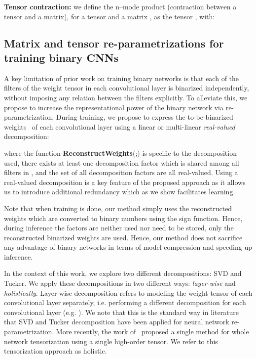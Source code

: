 \documentclass[10pt,twocolumn,letterpaper]{article}
\begin{document}
\noindent \textbf{Tensor contraction:} we define the n--mode product (contraction between a tensor and a matrix), for a tensor  and a matrix , as the tensor , with:















\subsection{Matrix and tensor re-parametrizations for training binary CNNs}\label{ssec:binary-tensorized-convolutional}





A key limitation of prior work on training binary networks is that each of the filters of the weight tensor in each convolutional layer is binarized independently, without imposing any relation between the filters explicitly. To alleviate this, we propose to increase the representational power of the binary network via re-parametrization. During training, we propose to express the to-be-binarized weights~ of each convolutional layer using a linear or multi-linear \textit{real-valued} decomposition:  

where the function \textbf{ReconstructWeights}(;) is specific to the decomposition used, there exists at least one decomposition factor  which is shared among all filters in , and the set of all decomposition factors  are all real-valued. Using a real-valued decomposition is a key feature of the proposed approach as it allows us to introduce additional redundancy which as we show facilitates learning. 

Note that when training is done, our method simply uses the  reconstructed weights which are converted to binary numbers using the sign function. Hence, during inference the factors  are neither used nor need to be stored, only the reconstructed binarized weights are used. Hence, our method does not sacrifice any advantage of binary networks in terms of model compression and speeding-up inference.

In the context of this work, we explore two different decompositions: SVD and Tucker. We apply these decompositions in two different ways: \textit{layer-wise} and \textit{holistically}. Layer-wise decomposition refers to modeling the weight tensor of each convolutional layer separately, i.e. performing a different decomposition for each convolutional layer (e.g. \cite{lebedev2014speeding, yong2015compression, tai2015convolutional}). We note that this is the standard way in literature that SVD and Tucker decomposition have been applied for neural network re-parametrization.  More recently, the work of~\cite{kossaifi2018parametrizing} proposed a single method for whole network tensorization using a single high-order tensor. We refer to this tensorization approach as holistic.
\end{document}
